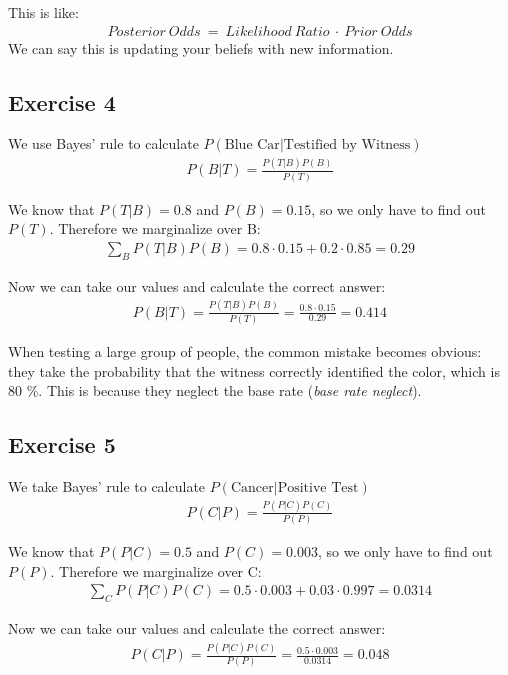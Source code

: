 This is like:
\begin{align*}
Posterior\ Odds\ =\ Likelihood\ Ratio\ \cdot\ Prior\ Odds
\end{align*}
We can say this is updating your beliefs with new information.


\subsection*{Exercise 4}
We use Bayes' rule to calculate $P(\text{Blue Car}|\text{Testified by Witness})$
\begin{align*}
P(B|T) = \frac{P(T|B)P(B)}{P(T)}
\end{align*}

We know that $P(T|B) = 0.8$ and $P(B) = 0.15$, so we only have to find out $P(T)$. Therefore we marginalize over B:
\begin{align*}
\sum_{B}{P(T|B)P(B)} = 0.8 \cdot 0.15 + 0.2 \cdot 0.85 = 0.29
\end{align*}

Now we can take our values and calculate the correct answer:
\begin{align*}
P(B|T) = \frac{P(T|B)P(B)}{P(T)} = \frac{0.8 \cdot 0.15}{0.29} = 0.414
\end{align*}

When testing a large group of people, the common mistake becomes obvious: they take the probability that the witness correctly identified the color, which is 80 \%. This is because they neglect the base rate (\textit{base rate neglect}).


\subsection*{Exercise 5}
We take Bayes' rule to calculate $P(\mbox{Cancer}|\mbox{Positive Test})$
\begin{align*}
P(C|P) = \frac{P(P|C)P(C)}{P(P)}
\end{align*}

We know that $P(P|C) = 0.5$ and $P(C) = 0.003$, so we only have to find out $P(P)$. Therefore we marginalize over C:
\begin{align*}
\sum_{C}{P(P|C)P(C)} = 0.5 \cdot 0.003 + 0.03 \cdot 0.997 = 0.0314
\end{align*}

Now we can take our values and calculate the correct answer:
\begin{align*}
P(C|P) = \frac{P(P|C)P(C)}{P(P)} = \frac{0.5 \cdot 0.003}{0.0314} = 0.048
\end{align*}

